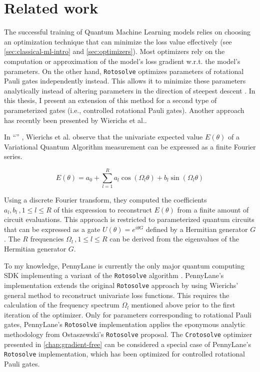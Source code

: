 \chapter{Related work}
\label{chap:related-work}

The successful training of Quantum Machine Learning models relies on choosing an
optimization technique that can minimize the loss value effectively (see
\autoref{sec:classical-ml-intro} and \autoref{sec:optimizers}).
Most optimizers rely on the computation or approximation of the model's loss
gradient w.r.t. the model's parameters.
On the other hand, \texttt{Rotosolve} optimizes parameters of rotational Pauli
gates independently instead.
This allows it to minimize these parameters analytically instead of altering
parameters in the direction of steepest descent
\cite{ostaszewski_structure_2021}.
In this thesis, I present an extension of this method for a second type of
parameterized gates (i.e., controlled rotational Pauli gates).
Another approach has recently been presented by Wierichs et al..

In ``\emph{}''
\cite{wierichs_general_2022}, Wierichs et al. observe that the univariate
expected value $E(\theta)$ of a Variational Quantum Algorithm measurement can be
expressed as a finite Fourier series.

$$E(\theta) = a_0 + \sum_{l=1}^R a_l \cos(\Omega_l \theta) + b_l \sin(\Omega_l \theta)$$

Using a discrete Fourier transform, they computed the coefficients
$a_l, b_l\,, 1 \leq l \leq R$ of this expression to reconstruct $E(\theta)$ from a
finite amount of circuit evaluations.
This approach is restricted to parameterized quantum circuits that can be
expressed as a gate $U(\theta) = e^{i \theta G}$ defined by a Hermitian
generator $G$.
The $R$ frequencies $\Omega_l\,, 1 \leq l \leq R$ can be derived from the
eigenvalues of the Hermitian generator $G$.

To my knowledge, PennyLane is currently the only major quantum computing SDK
implementing a variant of the \texttt{Rotosolve} algorithm
\cite{bergholm_pennylane_2022,ostaszewski_structure_2021}.
PennyLane's implementation extends the original \texttt{Rotosolve} approach by
using Wierichs' general method to reconstruct univariate loss functions.
This requires the calculation of the frequency spectrum $\Omega_l$ mentioned
above prior to the first iteration of the optimizer.
Only for parameters corresponding to rotational Pauli gates, PennyLane's
\texttt{Rotosolve} implementation applies the eponymous analytic methodology
from Ostaszewski's \texttt{Rotosolve} proposal.
The \texttt{Crotosolve} optimizer presented in \autoref{chap:gradient-free} can
be considered a special case of PennyLane's \texttt{Rotosolve} implementation,
which has been optimized for controlled rotational Pauli gates.
